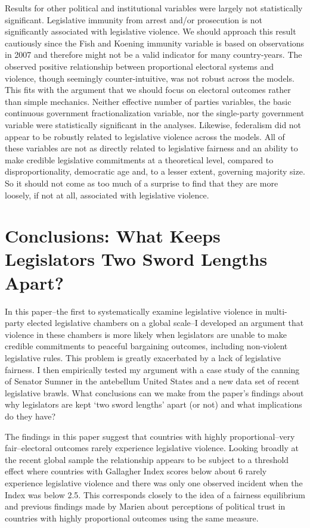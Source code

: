 \documentclass[a4paper]{article}\usepackage[]{graphicx}\usepackage[]{color}
\begin{document}
Results for other political and institutional variables were largely not statistically significant. Legislative immunity from arrest and/or prosecution is not significantly associated with legislative violence. We should approach this result cautiously since the Fish and Koening immunity variable is based on observations in 2007 and therefore might not be a valid indicator for many country-years. The observed positive relationship between proportional electoral systems and violence, though seemingly counter-intuitive, was not robust across the models. This fits with the argument that we should focus on electoral outcomes rather than simple mechanics. Neither effective number of parties variables, the basic continuous government fractionalization variable, nor the single-party government variable were statistically significant in the analyses. Likewise, federalism did not appear to be robustly related to legislative violence across the models. All of these variables are not as directly related to legislative fairness and an ability to make credible legislative commitments at a theoretical level, compared to disproportionality, democratic age and, to a lesser extent, governing majority size. So it should not come as too much of a surprise to find that they are more loosely, if not at all, associated with legislative violence.

\section*{Conclusions: What Keeps Legislators Two Sword Lengths Apart?}

In this paper--the first to systematically examine legislative violence in multi-party elected legislative chambers on a global scale--I developed an argument that violence in these chambers is more likely when legislators are unable to make credible commitments to peaceful bargaining outcomes, including non-violent legislative rules. This problem is greatly exacerbated by a lack of legislative fairness. I then empirically tested my argument with a case study of the canning of Senator Sumner in the antebellum United States and a new data set of recent legislative brawls. What conclusions can we make from the paper's findings about why legislators are kept `two sword lengths' apart (or not) and what implications do they have?

The findings in this paper suggest that countries with highly proportional--very fair--electoral outcomes rarely experience legislative violence. Looking broadly at the recent global sample the relationship appears to be subject to a threshold effect where countries with Gallagher Index scores below about 6 rarely experience legislative violence and there was only one observed incident when the Index was below 2.5. This corresponds closely to the idea of a fairness equilibrium and previous findings made by Marien \citeyearpar{Marien2011} about perceptions of political trust in countries with highly proportional outcomes using the same measure. 
\end{document}
